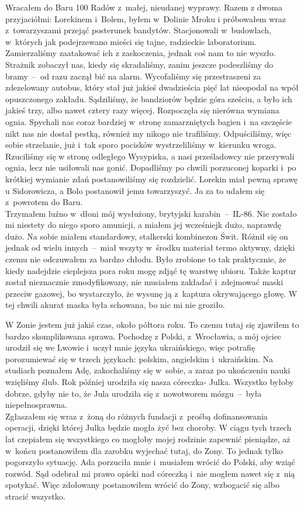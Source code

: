 \documentclass[../MAIN.tex]{subfiles}
\begin{document}
Wracałem do Baru 100 Radów z~małej, nieudanej wyprawy. Razem z
dwoma przyjaciółmi: Lorekinem i~Bolem, byłem w~Dolinie Mroku i
próbowałem wraz z~towarzyszami przejąć posterunek bandytów.
Stacjonowali w~budowlach, w~których jak podejrzewano mieści się
tajne, radzieckie laboratorium. Zamierzaliśmy zaatakować ich z
zaskoczenia, jednak coś nam to nie wyszło. Strażnik zobaczył
nas, kiedy się skradaliśmy, zanim jeszcze podeszliśmy do
bramy~--~od razu zaczął bić na alarm. Wycofaliśmy się
przestraszeni za zdezelowany autobus, który stał już jakieś
dwadzieścia pięć lat
nieopodal na wpół opuszczonego zakładu. Sądziliśmy,
że bandziorów będzie góra sześciu, a było ich jakieś
trzy, albo nawet cztery razy więcej. Rozpoczęła się
nierówna wymiana ognia.
Spychali nas coraz bardziej w~stronę zamarzniętych bagien i~na
szczęście nikt nas nie dostał pestką, również my nikogo nie
trafiliśmy. Odpuściliśmy, więc sobie strzelanie, już i~tak
sporo pocisków wystrzeliliśmy w~kierunku wroga. Rzuciliśmy się
w stronę odległego Wysypiska, a nasi prześladowcy nie
przerywali ognia, lecz nie usiłowali nas gonić. Dopadliśmy po
chwili porzuconej koparki i~po krótkiej wymianie zdań
postanowiliśmy się rozdzielić. Lorekin miał pewną sprawę u
Sidorowicza, a Bolo postanowił jemu towarzyszyć. Ja za to
udałem się z~powrotem do Baru.
\\
Trzymałem luźno w~dłoni mój wysłużony, brytyjski
karabin~--~IL-86. Nie zostało mi niestety do niego sporo
amunicji, a
miałem jej wcześniej\3k dużo, naprawdę dużo. Na sobie miałem
standardowy, stalkerski kombinezon Świt. Różnił się on jednak
od wielu innych~--~miał wszyty w~środku materiał termo aktywny,
dzięki czemu nie odczuwałem za bardzo chłodu. Było zrobione to
tak praktycznie, że kiedy nadejdzie cieplejsza pora roku mogę
zdjąć tę warstwę ubioru. Także kaptur został nieznacznie
zmodyfikowany, nie musiałem zakładać i~zdejmować maski przeciw
gazowej, bo wystarczyło, że wysunę ją z~kaptura okrywającego
głowę. W tej chwili akurat maska była schowana, bo nic mi nie
groziło.

W Zonie jestem już jakiś czas, około półtora roku. To czemu
tutaj się zjawiłem to bardzo skomplikowana sprawa. Pochodzę z
Polski, z~Wrocławia, a mój ojciec urodził się we Lwowie i~uczył
mnie języka ukraińskiego, więc potrafię porozumiewać się w
trzech językach: polskim, angielskim i~ukraińskim. Na studiach
poznałem Adę, zakochaliśmy się w~sobie, a zaraz po ukończeniu
nauki wzięliśmy ślub. Rok później urodziła się nasza córeczka-
Julka. Wszystko byłoby dobrze, gdyby nie to, że Jula urodziła
się z~nowotworem mózgu~--~była niepełnosprawna.
\\
Zgłaszałem się
wraz z~żoną do różnych fundacji z~prośbą dofinansowania
operacji, dzięki której Julka będzie mogła żyć bez choroby. W
ciągu tych trzech lat czepiałem się wszystkiego co mogłoby
mojej rodzinie zapewnić pieniądze, aż w~końcu postanowiłem dla
zarobku wyjechać tutaj, do Zony. To jednak tylko pogorszyło
sytuację. Ada porzuciła mnie i~musiałem wrócić do Polski, aby
wziąć rozwód. Sąd odebrał mi prawo opieki nad córeczką i~nie
mogłem nawet się z~nią spotykać. Więc zdołowany postanowiłem
wrócić do Zony, wzbogacić się albo stracić wszystko.
\end{document}
